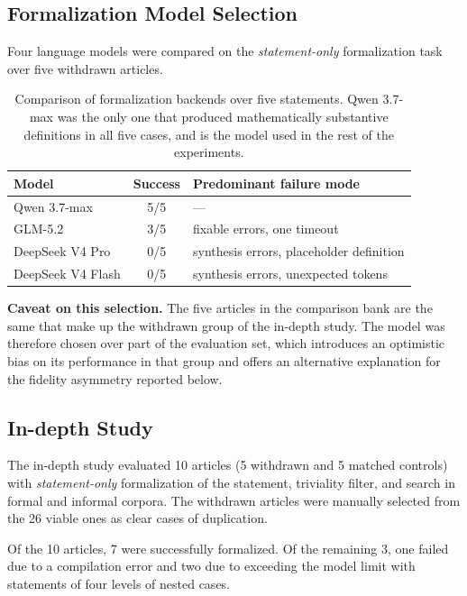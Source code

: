 \documentclass{article}
\theoremstyle{remark}
\begin{document}
\subsection{Formalization Model Selection}

Four language models were compared on the \textit{statement-only} formalization task over five withdrawn articles.

\begin{table}[htbp]
\centering
\small
\begin{tabular}{lcl}
\toprule
Model & Success & Predominant failure mode \\
\midrule
Qwen 3.7-max      & 5/5 & --- \\
GLM-5.2           & 3/5 & fixable errors, one timeout \\
DeepSeek V4 Pro   & 0/5 & synthesis errors, placeholder definition \\
DeepSeek V4 Flash & 0/5 & synthesis errors, unexpected tokens \\
\bottomrule
\end{tabular}
\caption{Comparison of formalization backends over five statements. Qwen 3.7-max was the only one that produced mathematically substantive definitions in all five cases, and is the model used in the rest of the experiments.}
\label{tab:modelos}
\end{table}

\textbf{Caveat on this selection.} The five articles in the comparison bank are the same that make up the withdrawn group of the in-depth study. The model was therefore chosen over part of the evaluation set, which introduces an optimistic bias on its performance in that group and offers an alternative explanation for the fidelity asymmetry reported below.

\subsection{In-depth Study}

The in-depth study evaluated 10 articles (5 withdrawn and 5 matched controls) with \textit{statement-only} formalization of the statement, triviality filter, and search in formal and informal corpora. The withdrawn articles were manually selected from the 26 viable ones as clear cases of duplication.

Of the 10 articles, 7 were successfully formalized. Of the remaining 3, one failed due to a compilation error and two due to exceeding the model limit with statements of four levels of nested cases.
\end{document}
